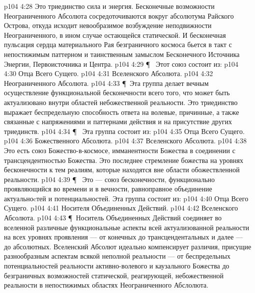\vs p104 4:28 Это триединство  сила и энергия. Бесконечные возможности Неограниченного Абсолюта сосредоточиваются вокруг абсолютума Райского Острова, откуда исходит невообразимое возбуждение неподвижности Неограниченного, в ином случае остающейся статической. И бесконечная пульсация сердца материального Рая безграничного космоса бьется в такт с непостижимым паттерном и таинственным замыслом Бесконечного Источника Энергии, Первоисточника и Центра.
\vs p104 4:29 \P\  Этот союз состоит из:
\vs p104 4:30 \bibnobreakspace Отца Всего Сущего.
\vs p104 4:31 \bibnobreakspace Вселенского Абсолюта.
\vs p104 4:32 \bibnobreakspace Неограниченного Абсолюта.
\vs p104 4:33 \P\ Эта группа делает вечным осуществление функциональной бесконечности всего того, что может быть актуализовано внутри областей небожественной реальности. Это триединство выражает беспредельную способность ответа на волевые, причинные, а также связанные с напряжениями и паттернами действия и на присутствие других триединств.
\vs p104 4:34 \P\  Эта группа состоит из:
\vs p104 4:35 \bibnobreakspace Отца Всего Сущего.
\vs p104 4:36 \bibnobreakspace Божественного Абсолюта.
\vs p104 4:37 \bibnobreakspace Вселенского Абсолюта.
\vs p104 4:38 Это есть союз Божество\hyp{}в\hyp{}космосе, имманентности Божества в соединении с трансцендентностью Божества. Это последнее стремление божества на уровнях бесконечности к тем реалиям, которые находятся вне области обожествленной реальности.
\vs p104 4:39 \P\  Это --- союз бесконечности, функционально проявляющийся во времени и в вечности, равноправное объединение актуальноcтей и потенциальностей. Эта группа состоит из:
\vs p104 4:40 \bibnobreakspace Отца Всего Сущего.
\vs p104 4:41 \bibnobreakspace Носителя Объединенных Действий.
\vs p104 4:42 \bibnobreakspace Вселенского Абсолюта.
\vs p104 4:43 \P\ Носитель Объединенных Действий соединяет во вселенной различные функциональные аспекты всей актуализованной реальности на всех уровнях проявления --- от конечных до трансцендентальных и далее --- до абсолютных. Вселенский Абсолют идеально компенсирует различия, присущие разнообразным аспектам всякой неполной реальности --- от беспредельных потенциальностей реальности активно\hyp{}волевого и каузального Божества до безграничных возможностей статической, реагирующей, небожественной реальности в непостижимых областях Неограниченного Абслолюта.
